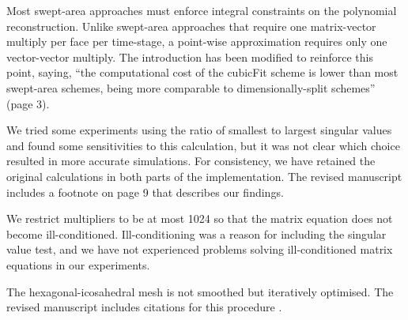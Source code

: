 \documentclass[times]{elsarticle}
\begin{document}
\begin{quotation}
\begin{comment}
\item Why do you prefer the point wise approximation?
\end{comment}
\end{quotation}
Most swept-area approaches must enforce integral constraints on the polynomial reconstruction.  Unlike swept-area approaches that require one matrix-vector multiply per face per time-stage, a point-wise approximation requires only one vector-vector multiply.
The introduction has been modified to reinforce this point, saying, ``the computational cost of the cubicFit scheme is lower than most swept-area schemes, being more comparable to dimensionally-split schemes'' (page 3).

\begin{quotation}
\begin{comment}
\item The singular value test should be relative to the largest singular value.
\end{comment}
\end{quotation}
We tried some experiments using the ratio of smallest to largest singular values and found some sensitivities to this calculation, but it was not clear which choice resulted in more accurate simulations.
For consistency, we have retained the original calculations in both parts of the implementation.  The revised manuscript includes a footnote on page 9 that describes our findings.

\begin{quotation}
\begin{comment}
\item The weighting can degrade the condition number of the least squares problem.
\end{comment}
\end{quotation}
We restrict multipliers to be at most 1024 so that the matrix equation does not become ill-conditioned.  Ill-conditioning was a reason for including the singular value test, and we have not experienced problems solving ill-conditioned matrix equations in our experiments.

\begin{quotation}
\begin{comment}
\item Is there a smoothing of hexagonal-icosahedral mesh after refinement.
\end{comment}
\end{quotation}
The hexagonal-icosahedral mesh is not smoothed but iteratively optimised.  The revised manuscript includes citations for this procedure \citep{heikes-randall1995a,heikes-randall1995b}.
\end{document}
